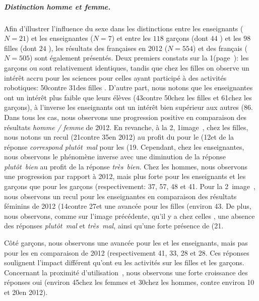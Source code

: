           \subparagraph{Distinction homme et femme.}
            Afin d'illustrer l'influence du sexe dans les distinctions entre les enseignants ($N=21$) et les enseignantes ($N=7$) et entre les $118$ garçons (dont $44$ ) et les $98$ filles (dont $24$ ), les résultats des françaises en 2012 ($N=554$) et des français ($N=505$) sont également présentés.
            Deux premiers constats sur la 1\iere {}({\footnotesize page~\pageref{QA1}}): les garçons  ou  sont relativement identiques, tandis que chez les filles on observe un intérêt accru pour les sciences pour celles ayant participé à des activités robotiques: 50\prc contre 31\prc des filles .
            D'autre part, nous notons que les enseignantes ont un intérêt plus faible que leurs élèves (43\prc contre 50\prc chez les filles et 61\prc chez les garçons), à l'inverse les enseignants ont un intérêt bien supérieur aux autres (86\prc[)]. Dans tous les cas, nous observons une progression positive en comparaison des résultats \textit{homme / femme} de 2012.
            En revanche, à la 2\ieme {}, 1\iere image~, chez les filles, nous notons un recul (21\prc contre 35\prc en 2012) au profit du  pour le  (12\prc[)] et de la réponse \textit{correspond plutôt~mal} pour les  (19\prc[)]. 
            Cependant, chez les enseignantes, nous observons le phénomène inverse avec une diminution de la réponse \textit{plutôt~bien} au profit de la réponse \textit{très~bien}.
            Chez les hommes, nous observons une progression par rapport à 2012, mais plus forte pour les enseignants et les garçons  que pour les garçons  (respectivement: 37, 57, 48 et 41\prc[)]. 
            Pour la 2\nde~image~, nous observons un recul pour les enseignantes en comparaison des résultats féminins de 2012 (14\prc contre 27\prc[)] et une avancée pour les filles (environ 43\prc[)]. 
            De plus, nous observons, comme sur l'image précédente, qu'il y a chez celles , une absence des réponses \textit{plutôt~mal} et \textit{très~mal}, ainsi qu'une forte présence de  (21\prc[)].\par%
            Côté garçons, nous observons une avancée pour les  et les enseignants, mais pas pour les  en comparaison de 2012 (respectivement 41, 33, 28 et 28\prc[)].
            Ces réponses soulignent l'impact différent qu'ont eu les activités sur les filles et les garçons.
            Concernant la proximité d'utilisation~, nous observons une forte croissance des réponses oui (environ 45\prc chez les femmes et 30\prc chez les hommes, contre environ 10 et 20\prc en 2012). 
